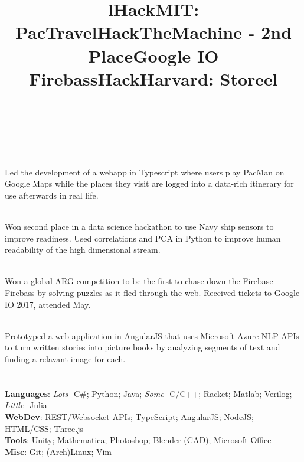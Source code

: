 \documentclass[margin,line,11pt,letterpaper]{res}
\let\oldsection\section
\renewcommand{\section}[1]{\vspace{-2mm}\oldsection{\small\sc {#1}}}
\begin{document}
\begin{resume}
    \begin{format}
        \title{l}\\
        \body\\
    \end{format}
    
    \title{\textbf{HackMIT: PacTravel}}
    \begin{position}
        \vspace{-3mm} \\
        Led the development of a webapp in Typescript where users play PacMan on Google Maps while the places they visit are logged into a data-rich itinerary for use afterwards in real life.
    \end{position}
    
    \title{\textbf{HackTheMachine - 2nd Place}}
    \begin{position}
        \vspace{-3mm} \\
        Won second place in a data science hackathon to use Navy ship sensors to improve readiness. 
        Used correlations and PCA in Python to improve human readability of the high dimensional stream.
    \end{position}
    
    \title{\textbf{Google IO Firebass}}
    \begin{position}
        \vspace{-3mm}\\
        Won a global ARG competition to be the first to chase down the Firebase Firebass by solving puzzles as it fled through the web.
        Received tickets to Google IO 2017, attended May.
    \end{position}
    
    \title{\textbf{HackHarvard: Storeel}}
    \begin{position}
        \vspace{-3mm}\\
        Prototyped a web application in AngularJS that uses Microsoft Azure NLP APIs to turn written stories into picture books by analyzing segments of text and finding a relavant image for each.
    \end{position}
    
    
    \section{Computer Skills}
    \renewcommand{\linespread}{5}
    \textbf{Languages}:
    \textit{Lots-} C\#; Python; Java;
    \textit{Some-} C/C++; Racket; Matlab; Verilog;
    \textit{Little-} Julia \\
    \textbf{WebDev}:
    REST/Websocket APIs; TypeScript; AngularJS; NodeJS; HTML/CSS; Three.js \\
    \textbf{Tools}:
    Unity; Mathematica; Photoshop; Blender (CAD); Microsoft Office \\
    \textbf{Misc}:
    Git; (Arch)Linux; Vim
     

\end{resume}
\end{document}
